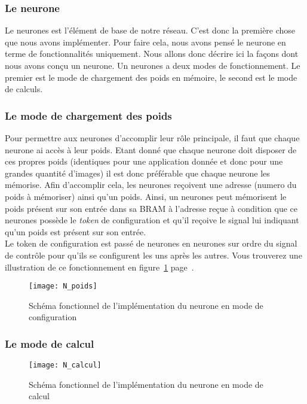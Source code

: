 \subsubsection{Le neurone}
	Le neurones est l'élément de base de notre réseau. 
	C'est donc la première chose que nous avons implémenter. 
	Pour faire cela, nous avons pensé le neurone en terme de 
	fonctionnalités uniquement. 
	Nous allons donc décrire ici la façons dont nous avons conçu un neurone. 
	Un neurones a deux modes de fonctionnement. 
	Le premier est le mode de chargement des poids en mémoire, le second 
	est le mode de calculs.
	
	\subsubsection{Le mode de chargement des poids}
	Pour permettre aux neurones d'accomplir leur rôle principale, il faut que chaque neurone ai 
	accès à leur poids. Etant donné que chaque neurone doit disposer de ces propres poids 
	(identiques pour une application donnée et donc pour une grandes quantité d'images) 
	il est donc préférable que chaque neurone les mémorise. Afin d'accomplir cela, 
	les neurones reçoivent une adresse (numero du poids à mémoriser) ainsi qu'un poids. 
	Ainsi, un neurones peut mémorisent le poids présent sur son entrée dans 
	sa BRAM à l'adresse reçue à condition que ce neurones possède le {\em token} de 
	configuration et qu'il reçoive le signal lui indiquant qu'un poids est présent sur son entrée.\\
	Le token de configuration est passé de neurones en neurones 
	sur ordre du signal de contrôle pour qu'ils se configurent les uns après les autres. 
	Vous trouverez une illustration de ce fonctionnement en 
	figure~\ref{N_poids} page~\pageref{N_poids}.
	\begin{figure}[h!]
    		\begin{center}
    			\texttt{[image: N\_poids]}
    			\caption{Schéma fonctionnel de l'implémentation du neurone en mode de configuration}
		\end{center}
		\label{N_poids}
	\end{figure}
	
	\subsubsection{Le mode de calcul}
	\begin{figure}[h!]
    		\begin{center}
    			\texttt{[image: N\_calcul]}
    			\caption{Schéma fonctionnel de l'implémentation du neurone en mode de calcul}
		\end{center}
    		\label{N_calcul}
	\end{figure}

